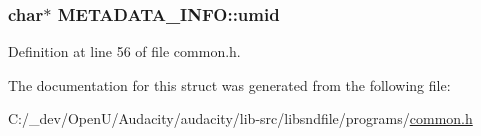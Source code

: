 \subsubsection[{\texorpdfstring{umid}{umid}}]{ char$\ast$ M\+E\+T\+A\+D\+A\+T\+A\+\_\+\+I\+N\+F\+O\+::umid}\hypertarget{struct_m_e_t_a_d_a_t_a___i_n_f_o_a0f44e89558197c54484713444a5cf52d}{}\label{struct_m_e_t_a_d_a_t_a___i_n_f_o_a0f44e89558197c54484713444a5cf52d}


Definition at line 56 of file common.\+h.



The documentation for this struct was generated from the following file\+:\begin{DoxyCompactItemize}
\item 
C\+:/\+\_\+dev/\+Open\+U/\+Audacity/audacity/lib-\/src/libsndfile/programs/\hyperlink{libsndfile_2programs_2common_8h}{common.\+h}\end{DoxyCompactItemize}
